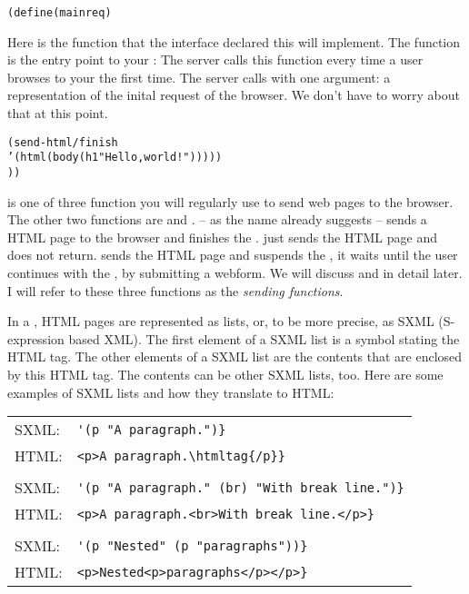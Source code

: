 \begin{alltt}
    (define (main req)
\end{alltt}

Here is the  function that the interface declared this
\surflet will implement.  The  function is the entry point
to your \surflet:  The server calls this function every time a user
browses to your \surflet the first time.  The server calls 
with one argument: a representation of the inital request of the
browser.  We don't have to worry about that at this point.

\begin{alltt}
      (send-html/finish
       '(html (body (h1 "Hello, world!")))))
    ))
\end{alltt}

 is one of three function you will regularly
use to send web pages to the browser.  The other two functions are
 and .
 -- as the name already suggests -- sends a
HTML page to the browser and finishes the \surflet.  
just sends the HTML page and does not return. 
 sends the HTML page and suspends the
\surflet, \ie it waits until the user continues with the \surflet, 
\eg by submitting a webform.  We will discuss  and
 in detail later.  I will refer to these three
functions as the \emph{sending functions}.

In a \surflet, HTML pages are represented as lists, or, to be more
precise, as SXML (S-expression based XML).\label{sec:SXML} The first
element of a SXML list is a symbol stating the HTML tag.  The other
elements of a SXML list are the contents that are enclosed by this
HTML tag.  The contents can be other SXML lists, too.  Here are some
examples of SXML lists and how they translate to HTML:

\begin{tabular}{ll}
SXML: & \verb|'(p "A paragraph.")}|  \\
HTML: & \verb|<p>A paragraph.\htmltag{/p}}|\\
\\
SXML: & \verb|'(p "A paragraph." (br) "With break line.")}| \\
HTML: & \verb|<p>A paragraph.<br>With break line.</p>}|\\
\\
SXML: & \verb|'(p "Nested" (p "paragraphs"))}|\\
HTML: & \verb|<p>Nested<p>paragraphs</p></p>}|\\
\end{tabular}


